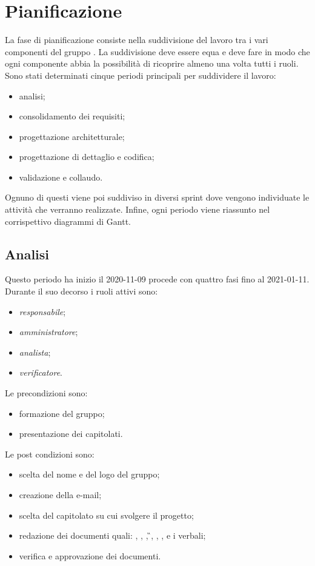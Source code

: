 \section{Pianificazione}
La fase di pianificazione consiste nella suddivisione del lavoro tra i vari componenti del gruppo \Gruppo{}. La suddivisione deve essere equa e deve fare in modo che ogni componente abbia la possibilità di ricoprire almeno una volta tutti i ruoli.
Sono stati determinati cinque periodi principali per suddividere il lavoro:
\begin{itemize}
\item analisi;
\item consolidamento dei requisiti;
\item progettazione architetturale;
\item progettazione di dettaglio e codifica;
\item validazione e collaudo.
\end{itemize}
Ognuno di questi viene poi suddiviso in diversi sprint dove vengono individuate le attività che verranno realizzate.
Infine, ogni periodo viene riassunto nel corrispettivo diagrammi di Gantt.
\subsection{Analisi}
Questo periodo ha inizio il 2020-11-09 procede con quattro fasi fino al 2021-01-11.
Durante il suo decorso i ruoli attivi sono:
\begin{itemize}
\item \textit{responsabile};
\item \textit{amministratore};
\item \textit{analista};
\item \textit{verificatore}.
\end{itemize}
Le precondizioni sono:
\begin{itemize}
	\item formazione del gruppo;
	\item presentazione dei capitolati.
\end{itemize}
Le post condizioni sono:
\begin{itemize}
	\item scelta del nome e del logo del gruppo;
	\item creazione della e-mail;
	\item scelta del capitolato su cui svolgere il progetto;
	\item redazione dei documenti quali: \SdF{}, \NdP{}, \PdP{}, \G{}, \LdP{}, \PdQ{}, \AdR{} e i verbali;
	\item verifica e approvazione dei documenti.
\end{itemize}
